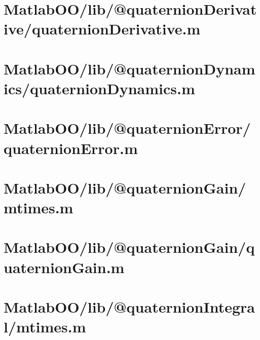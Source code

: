 \pagebreak
\section{MatlabOO/lib/@quaternionDerivative/quaternionDerivative.m}\label{code:MatlabOO/lib/@quaternionDerivative/quaternionDerivative.m}


\pagebreak
\section{MatlabOO/lib/@quaternionDynamics/quaternionDynamics.m}\label{code:MatlabOO/lib/@quaternionDynamics/quaternionDynamics.m}


\pagebreak
\section{MatlabOO/lib/@quaternionError/quaternionError.m}\label{code:MatlabOO/lib/@quaternionError/quaternionError.m}


\pagebreak
\section{MatlabOO/lib/@quaternionGain/mtimes.m}\label{code:MatlabOO/lib/@quaternionGain/mtimes.m}


\pagebreak
\section{MatlabOO/lib/@quaternionGain/quaternionGain.m}\label{code:MatlabOO/lib/@quaternionGain/quaternionGain.m}


\pagebreak
\section{MatlabOO/lib/@quaternionIntegral/mtimes.m}\label{code:MatlabOO/lib/@quaternionIntegral/mtimes.m}


